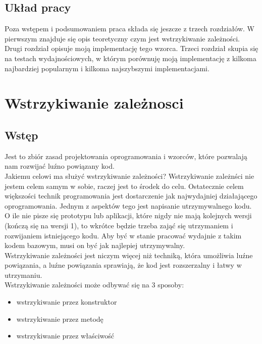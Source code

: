 \documentclass[12pt]{article}
\begin{document}
\subsection{Układ pracy}
Poza wstępem i podsumowaniem praca składa się jeszcze z trzech rozdziałów. W pierwszym znajduje się opis teoretyczny czym jest wstrzykiwanie zależności. Drugi rozdział opisuje moją implementację tego wzorca. Trzeci rozdział skupia się na testach wydajnościowych, w którym porównuję moją implementację z kilkoma najbardziej popularnym i kilkoma najszybszymi implementacjami.



\clearpage

\section{Wstrzykiwanie zależnosci}
\subsection{Wstęp}
Jest to zbiór zasad projektowania oprogramowania i wzorców, które pozwalają nam rozwijać luźno powiązany kod.\\
Jakiemu celowi ma służyć wstrzykiwanie zależności? Wstrzykiwanie zależnści nie jestem celem samym w sobie, raczej jest to środek do celu. Ostatecznie celem większości technik programowania jest dostarczenie jak najwydajniej działającego oprogramowania. Jednym z aspektów tego jest napisanie utrzymywalnego kodu.\\
O ile nie pisze się prototypu lub aplikacji, które nigdy nie mają kolejnych wersji (kończą się na wersji 1), to wkrótce będzie trzeba zająć się utrzymaniem i rozwijaniem istniejącego kodu. Aby być w stanie pracować wydajnie z takim kodem bazowym, musi on być jak najlepiej utrzymywalny.\\
Wstrzykiwanie zależności jest niczym więcej niż techniką, która umożliwia luźne powiązania, a luźne powiązania sprawiają, że kod jest rozszerzalny i łatwy w utrzymaniu.\cite{dependency_injection}\\
Wstrzykiwanie zależności może odbywać się na 3 sposoby:
\begin{itemize}
	\item wstrzykiwanie przez konstruktor
	\item wstrzykiwanie przez metodę
	\item wstrzykiwanie przez właściwość
\end{itemize}
\end{document}
